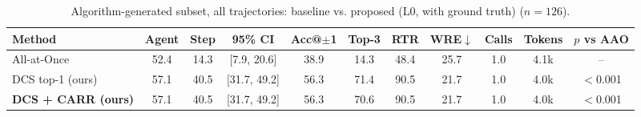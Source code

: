 \begin{table}[t]
\centering
\caption{Algorithm-generated subset, all trajectories: baseline vs. proposed (L0, with ground truth) ($n=126$).}
\label{tab:main_full}
\footnotesize
\setlength{\tabcolsep}{4pt}
\begin{tabular}{@{}lcccccccccc@{}}
\toprule
Method & Agent & Step & 95\% CI & Acc@$\pm$1 & Top-3 & RTR & WRE$\downarrow$ & Calls & Tokens & $p$ vs AAO \\
\midrule
All-at-Once~\cite{zhang2025whowhen} & 52.4 & 14.3 & [7.9, 20.6] & 38.9 & 14.3 & 48.4 & 25.7 & 1.0 & 4.1k & -- \\
DCS top-1 (ours) & 57.1 & 40.5 & [31.7, 49.2] & 56.3 & 71.4 & 90.5 & 21.7 & 1.0 & 4.0k & $<$0.001 \\
\textbf{DCS + CARR (ours)} & 57.1 & 40.5 & [31.7, 49.2] & 56.3 & 70.6 & 90.5 & 21.7 & 1.0 & 4.0k & $<$0.001 \\
\bottomrule
\end{tabular}
\end{table}